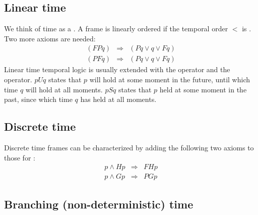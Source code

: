 \eit

\subsection{Linear time}
\bit
\w We think of time as a .
\w A frame is linearly ordered if the temporal order $<$ is .
\w Two more axioms are needed:
  \begin{eqnarray*}
   (FPq) & \Rightarrow & (Pq \vee q \vee Fq)\\
  (PFq) & \Rightarrow & (Pq \vee q \vee Fq)
  \end{eqnarray*}
\w Linear time temporal logic is usually extended with the  operator
and the  operator. 
\w $p U q$ states that $p$ will hold at some moment
in the future, until which time $q$ will hold at all moments.
\w $p S q$ states that $p$ held at some moment in the past, since which time
$q$ has held at all moments.
\eit

\subsection{Discrete time}
\bit
\w Discrete time frames can be characterized by adding the following two
axioms to those for :
  \begin{eqnarray*}
   p \wedge Hp   & \Rightarrow & FH p \\
   p \wedge Gp   & \Rightarrow & PG p 
  \end{eqnarray*}
\eit

\subsection{Branching (non-deterministic) time}